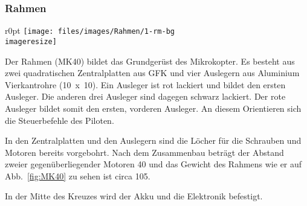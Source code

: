 \subsubsection{Rahmen}
\begin{wrapfigure}{r}{0pt}
	\texttt{[image: files/images/Rahmen/1-rm-bg\\imageresize]}
	\label{fig:MK40}
\end{wrapfigure}

Der Rahmen (MK40) bildet das Grundgerüst des Mikrokopter.
Es besteht aus zwei quadratischen Zentralplatten aus \ac{GFK}
und vier Auslegern aus Aluminium Vierkantrohre (\unit{10 x 10}{\milli\metre}).
Ein Ausleger ist rot lackiert und bildet den ersten Ausleger.
Die anderen drei Ausleger sind dagegen schwarz lackiert.
Der rote Ausleger bildet somit den ersten, vorderen Ausleger.
An diesem Orientieren sich die Steuerbefehle des Piloten.

In den Zentralplatten und den Auslegern sind die
Löcher für die Schrauben und Motoren bereits vorgebohrt.
Nach dem Zusammenbau beträgt
der Abstand zweier gegenüberliegender Motoren \unit{40}{\centi\metre}
und das Gewicht des Rahmens wie er auf Abb.~\vref{fig:MK40}
zu sehen ist circa \unit{105}{\gram}.

In der Mitte des Kreuzes wird der Akku und die Elektronik befestigt.
